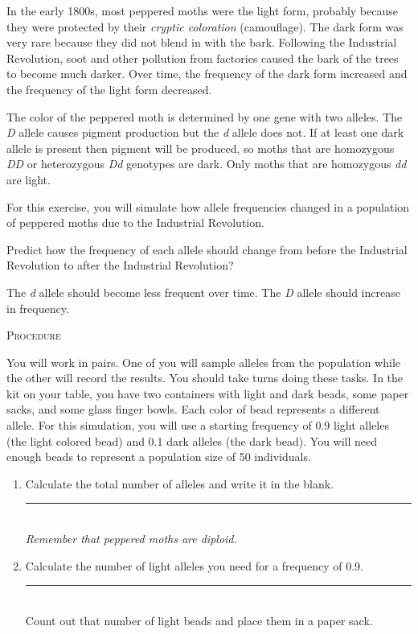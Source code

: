 \documentclass[12pt]{exam}
\newcommand*\AnswerBox[2]{%
    \parbox[t][#1]{0.92\textwidth}{%
    \begin{solution}#2\end{solution}}
    \vspace*{\stretch{1}}
}
\newcommand{\allele}[1]{\textit{#1}}
\begin{document}
\begin{questions}
In the early 1800s, most peppered moths were the light form, probably because they were protected by their \emph{cryptic coloration} (camouflage). The dark form was very rare because they did not blend in with the bark. Following the Industrial Revolution, soot and other pollution from factories caused the bark of the trees to become much darker. Over time, the frequency of the dark form increased and the frequency of the light form decreased. 

The color of the peppered moth is determined by one gene with two alleles. The \allele{D} allele causes pigment production but the \allele{d} allele does not. If at least one dark allele is present then pigment will be produced, so moths that are homozygous \allele{DD} or heterozygous \allele{Dd} genotypes are dark. Only moths that are homozygous \allele{dd} are light. 

For this exercise, you will simulate how allele frequencies changed in a population of peppered moths due to the Industrial Revolution. 

\question\label{ques:selection_prediction}
Predict how the frequency of each allele should change from before the Industrial Revolution to after the Industrial Revolution?

\AnswerBox{2\baselineskip}{The \allele{d} allele should become less frequent over time. The \allele{D} allele should increase in frequency.}

\textsc{Procedure}

\medskip

You will work in pairs. One of you will sample alleles from the population while the other will record the results. You should take turns doing these tasks.  In the kit on your table, you have two containers with light and dark beads, some paper sacks, and some glass finger bowls. Each color of bead represents a different allele. For this simulation, you will use a starting frequency of 0.9 light alleles (the light colored bead) and 0.1 dark alleles (the dark bead). You will need enough beads to represent a population size of 50 individuals.

\begin{enumerate}

	\item Calculate the total number of alleles and write it in the blank. \hfill \rule{0.5in}{0.4pt}\\ \emph{Remember that peppered moths are diploid.} 
	
	\item Calculate the number of light alleles you need for a frequency of 0.9. \hfill \rule{0.5in}{0.4pt} \\ Count out that number of light beads and place them in a paper sack. 
	

\end{enumerate}
\end{questions}
\end{document}
